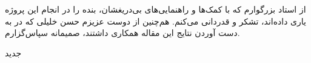 


\begin{center}
\end{center}

از استاد بزرگوارم که با کمک‌ها و راهنمایی‌های بی‌دریغشان، بنده را در انجام این پروژه یاری داده‌اند، تشکر و قدردانی می‌کنم.
هم‌چنین از دوست عزیزم حسن خلیلی که در به دست آوردن نتایج این مقاله همکاری داشتند، صمیمانه سپاس‌گزارم.

‌جدید
